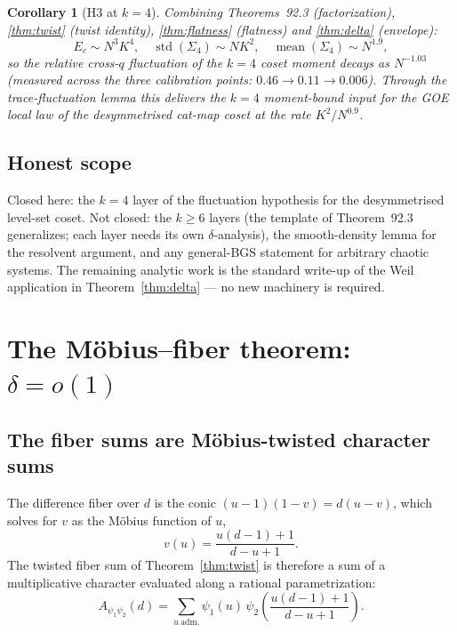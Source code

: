 \documentclass[11pt,reqno]{amsart}
\newtheorem{corollary}[theorem]{Corollary}
\theoremstyle{definition}
\begin{document}
\begin{corollary}[H3 at $k = 4$]
\label{cor:h3closed}
Combining Theorems~92.3 (factorization), \ref{thm:twist} (twist
identity), \ref{thm:flatness} (flatness) and \ref{thm:delta}
(envelope):
\[
  E_c \sim N^3 K^4, \quad
  \operatorname{std}(\Sigma_4) \sim N K^2, \quad
  \operatorname{mean}(\Sigma_4) \sim N^{1.9},
\]
so the relative cross-$q$ fluctuation of the $k{=}4$ coset moment
decays as $N^{-1.03}$ (measured across the three calibration points:
$0.46 \to 0.11 \to 0.006$).  Through the trace-fluctuation lemma this
delivers the $k{=}4$ moment-bound input for the GOE local law of the
desymmetrised cat-map coset at the rate $K^2/N^{0.9}$.
\end{corollary}

\subsection{Honest scope}

Closed here: the $k{=}4$ layer of the fluctuation hypothesis for the
desymmetrised level-set coset.  Not closed: the $k \ge 6$ layers (the
template of Theorem~92.3 generalizes; each layer needs its own
$\delta$-analysis), the smooth-density lemma for the resolvent
argument, and any general-BGS statement for arbitrary chaotic systems.
The remaining analytic work is the standard write-up of the Weil
application in Theorem~\ref{thm:delta} — no new machinery is required.



\section{The M\"obius--fiber theorem: $\delta = o(1)$}
\label{sec:r101}

\subsection{The fiber sums are M\"obius-twisted character sums}

The difference fiber over $d$ is the conic
$(u{-}1)(1{-}v) = d(u{-}v)$, which solves for $v$ as the M\"obius
function of $u$,
\[
  v(u) = \frac{u(d-1)+1}{\,d-u+1\,}.
\]
The twisted fiber sum of Theorem~\ref{thm:twist} is therefore a sum of
a multiplicative character evaluated along a rational parametrization:
\[
  A_{\psi_1\psi_2}(d) = \sum_{u \ \mathrm{adm.}} \psi_1(u)\,
  \psi_2\!\left(\frac{u(d-1)+1}{d-u+1}\right).
\]
\end{document}
